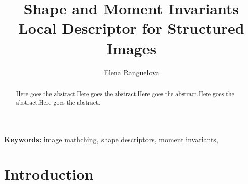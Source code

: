 \documentclass[a4paper,11pt]{article}
\begin{document}
\title{Shape and Moment Invariants Local Descriptor for Structured Images}

\author{Elena Ranguelova}
\date{}
\maketitle
\thispagestyle{empty}



\begin{abstract}
Here goes the abstract.Here goes the abstract.Here goes the abstract.Here goes the abstract.Here goes the abstract.
\end{abstract}
\textbf{Keywords:} image mathching, shape descriptors, moment invariants, 



\section{Introduction}
 
\end{document}
